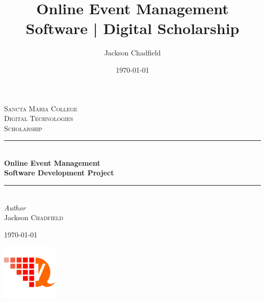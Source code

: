 \documentclass[a4paper,oneside,12pt]{report}
\title{Online Event Management Software | Digital Scholarship}
\author{Jackson Chadfield}
\date{\today}
\begin{document}
	\listoftodos

	\begin{titlepage} %
		\thispagestyle{firststyle}
		\newcommand{\HRule}{\rule{\linewidth}{0.5mm}} %

		\center %



		\textsc{\LARGE Sancta Maria College}\\[1.5cm] %

		\textsc{\Large Digital Technologies}\\[0.5cm] %

		\textsc{\large Scholarship}\\[0.5cm] %


		\HRule\\[0.4cm]

		{\huge\bfseries Online Event Management\\Software Development Project}\\[0.4cm] %

		\HRule\\[1.5cm]


		{\large\textit{Author}}\\
		Jackson \textsc{Chadfield} %


		\vfill\vfill\vfill %

		{\large\today} %


		\vfill\vfill
		\includegraphics[width=0.2\textwidth]{static/logo.png}\\[1cm] %


\end{titlepage}
\end{document}
